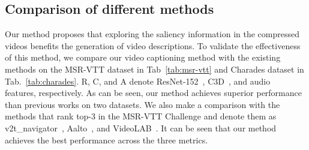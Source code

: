 \documentclass[a4paper,conference]{IEEEtran}
\begin{document}
\subsection{Comparison of different methods}
Our method proposes that exploring the saliency information in the compressed videos benefits the generation of video descriptions.
To validate the effectiveness of this method, we compare our video captioning method with the existing methods on the MSR-VTT dataset in Tab~\ref{tab:msr-vtt} and Charades dataset in Tab.~\ref{tab:charades}. R, C, and A denote ResNet-152~\cite{he2016deep}, C3D~\cite{tran2015learning}, and audio~\cite{hershey2017cnn} features, respectively.%
 As can be seen, our method achieves superior performance than previous works on two datasets. We also make a comparison with the methods that rank top-3 in the MSR-VTT Challenge and denote them as v2t\_navigator~\cite{jin2016describing}, Aalto~\cite{shetty2016frame}, and VideoLAB~\cite{ramanishka2016multimodal}. It can be seen that our method achieves the best performance across the three metrics. %

  
\end{document}
